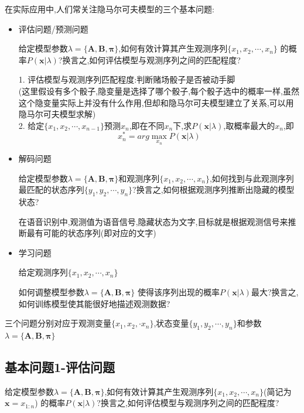 \documentclass[UTF8,a4paper]{ctexart}%
\begin{document}
            在实际应用中,人们常关注隐马尔可夫模型的三个基本问题:
            \begin{itemize}
              \item 评估问题/预测问题

                  给定模型参数$\lambda = \{\bm{A,B,\pi}\}$,如何有效计算其产生观测序列$\{x_1, x_2, \cdots , x_n\}$ 的概率$P(\bm{x} | \lambda)$?换言之,如何评估模型与观测序列之间的匹配程度?

                  {\color{blue}
                      1. 评估模型与观测序列匹配程度:判断赌场骰子是否被动手脚\\(这里假设有多个骰子,隐变量是选择了哪个骰子,每个骰子选中的概率一样,虽然这个隐变量实际上并没有什么作用,但却和隐马尔可夫模型建立了关系,可以用隐马尔可夫模型求解)\\
                      2. 给定$\{x_1, x_2, \cdots , x_{n-1}\}$预测$x_n$,即在不同$x_n$下,求$P(\bm{x} | \lambda)$,取概率最大的$x_n$,即
                          \[ x_n^* = arg \max_{x_n} P(\bm{x} | \lambda) \]
                  }

              \item 解码问题

                  给定模型参数$\lambda = \{\bm{A,B,\pi}\}$和观测序列$\{x_1, x_2, \cdots , x_n\}$,如何找到与此观测序列最匹配的状态序列$\{y_1,y_2 , \cdots , y_n\}$?换言之,如何根据观测序列推断出隐藏的模型状态?

                  {\color{blue}
                      在语音识别中,观测值为语音信号,隐藏状态为文字,目标就是根据观测信号来推断最有可能的状态序列(即对应的文字)
                  }

              \item 学习问题

                  给定观测序列$\{x_1, x_2, \cdots , x_n\}$

                  如何调整模型参数$\lambda = \{\bm{A,B,\pi}\}$ 使得该序列出现的概率$P(\bm{x} | \lambda)$最大?换言之,如何训练模型使其能很好地描述观测数据?

            \end{itemize}


            {\color{blue}
                三个问题分别对应于观测变量$\{x_1,x_2,\cdot x_n\}$,状态变量$\{y_1,y_2 , \cdots , y_n\}$和参数$\lambda = \{\bm{A,B,\pi}\}$
            }

        \subsection{基本问题1-评估问题}
            给定模型参数$\lambda = \{\bm{A,B,\pi}\}$,如何有效计算其产生观测序列$\{x_1, x_2, \cdots , x_n\}$(简记为$\bm{x} = x_{1:n}$) 的概率$P(\bm{x} | \lambda)$?换言之,如何评估模型与观测序列之间的匹配程度?
\end{document}
